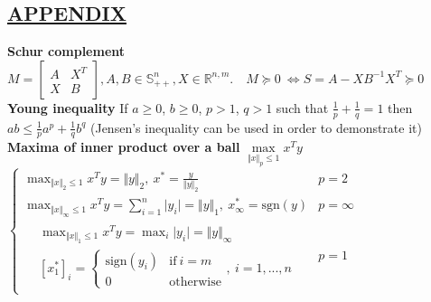 \documentclass[a4paper]{article}
\begin{document}
\subsection*{\color{cyan}
\textsf{\underline{APPENDIX}}}
\textbf{Schur complement} $M=\begin{bmatrix}
    A&X^T\\
    X&B
\end{bmatrix}, A,B\in\mathbb{S}^n_{++}, X \in \mathbb{R}^{n,m}. \quad M\succeq0 \  \iff S=A-XB^{-1}X^T\succeq0$  \\
\textbf{Young inequality} If $a\ge0$, $b\ge0$, $p>1$, $q>1$ such that $\frac{1}{p}+\frac{1}{q}=1$ then $ab \le \frac{1}{p}{a^p}+\frac{1}{q}{b^q}$ \textsf{(Jensen's inequality can be used in order to demonstrate it)}\\
\textbf{Maxima of inner product over a ball} $\underset{\Vert x \Vert_p \le 1}{\max} x^Ty$ $\begin{cases}
    \max_{\Vert x \Vert_2\le1}{x^T{y}}=\Vert{y}\Vert_2, \ x^{*}=\frac{y}{\Vert{y}\Vert_2}&{p=2}\\
    \max_{\Vert{x}\Vert_\infty\le1}{x^T{y}}=\sum_{i=1}^{n}{\vert{y_i}\vert}=\Vert{y}\Vert_1, \ x^{*}_\infty=\text{sgn}(y)&{p=\infty}\\
    \begin{aligned}
        &\max_{\Vert{x}\Vert_1\le{1}}{x^T{y}}=\max_i{\vert{y_i}\vert}=\Vert{y}\Vert_\infty \\
        &[x_1^{*}]_i=\begin{cases}
           \text{sign}(y_i)&\text{if} \ i=m\\
           0&\text{otherwise}
       \end{cases}, \ i=1,...,n
    \end{aligned}&p=1
   
\end{cases}$\\
\end{document}
